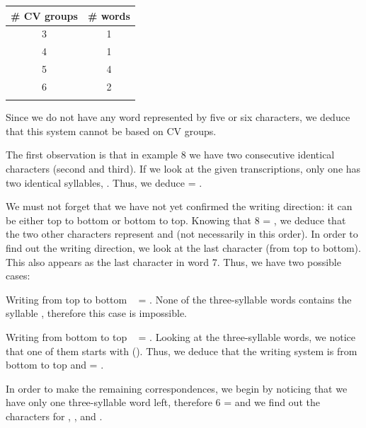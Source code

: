 \begin{refsection}
\begin{mysolution}
\begin{table}[H]
\begin{tabular}{cc}
\lsptoprule
\# CV   groups & \#   words \\ \midrule
3 & 1  \\
4 & 1  \\
5 & 4  \\
6 & 2  \\
\lspbottomrule
\end{tabular}
\end{table}

Since we do not have any word represented by five or six characters, we deduce that this system cannot be based on CV groups.

The first observation is that in example 8 we have two consecutive identical characters (second and third). If we look at the given transcriptions, only one has two identical syllables, . Thus, we deduce  = .

We must not forget that we have not yet confirmed the writing direction: it can be either top to bottom or bottom to top. Knowing that 8 = , we deduce that the two other characters represent  and  (not necessarily in this order). In order to find out the writing direction, we look at the last character (from top to bottom). This also appears as the last character in word 7. Thus, we have two possible cases:

\begin{description}[labelwidth=\widthof{\bfseries Case 2.}, leftmargin=!]
\item[Case 1.] Writing from top to bottom \Rightarrow\  = . None of the three-syllable words contains the syllable , therefore this case is impossible.\par
\item[Case 2.] Writing from bottom to top \Rightarrow\  = . Looking at the three-syllable words, we notice that one of them starts with  (). Thus, we deduce that the writing system is from bottom to top and  = .
\end{description}

In order to make the remaining correspondences, we begin by noticing that we have only one three-syllable word left, therefore 6 =  and we find out the characters for , , and .


\end{mysolution}
\end{refsection}

